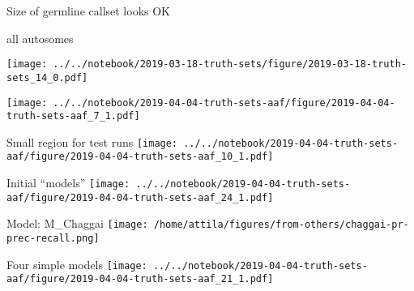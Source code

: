 \documentclass{beamer}
\begin{document}
\begin{frame}{Size of germline callset looks OK}
\begin{center}
{\large all autosomes}
\vfill

\texttt{[image: ../../notebook/2019-03-18-truth-sets/figure/2019-03-18-truth-sets\_14\_0.pdf]}
\end{center}
\end{frame}


\begin{frame}[plain]
\texttt{[image: ../../notebook/2019-04-04-truth-sets-aaf/figure/2019-04-04-truth-sets-aaf\_7\_1.pdf]}
\end{frame}

\begin{frame}{Small region for test runs}
\texttt{[image: ../../notebook/2019-04-04-truth-sets-aaf/figure/2019-04-04-truth-sets-aaf\_10\_1.pdf]}
\end{frame}


\begin{frame}[label=chaggais_model]{Initial ``models''}
\texttt{[image: ../../notebook/2019-04-04-truth-sets-aaf/figure/2019-04-04-truth-sets-aaf\_24\_1.pdf]}
\end{frame}

\begin{frame}{Model: M\_Chaggai}
\texttt{[image: /home/attila/figures/from-others/chaggai-pr-prec-recall.png]}
\end{frame}


\begin{frame}[plain]
Four simple models
\texttt{[image: ../../notebook/2019-04-04-truth-sets-aaf/figure/2019-04-04-truth-sets-aaf\_21\_1.pdf]}
\end{frame}
\end{document}
